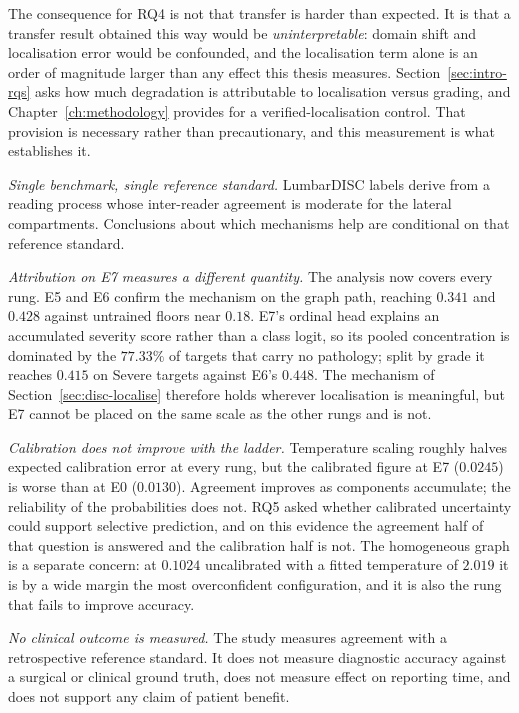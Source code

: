 \documentclass[12pt,a4paper]{report}
\begin{document}
The consequence for RQ4 is not that transfer is harder than expected. It is that
a transfer result obtained this way would be \emph{uninterpretable}: domain
shift and localisation error would be confounded, and the localisation term
alone is an order of magnitude larger than any effect this thesis measures.
Section~\ref{sec:intro-rqs} asks how much degradation is attributable to
localisation versus grading, and Chapter~\ref{ch:methodology} provides for a
verified-localisation control. That provision is necessary rather than
precautionary, and this measurement is what establishes it.

\emph{Single benchmark, single reference standard.} LumbarDISC labels derive
from a reading process whose inter-reader agreement is moderate for the lateral
compartments. Conclusions about which mechanisms help are conditional on that
reference standard.

\emph{Attribution on E7 measures a different quantity.} The analysis now covers
every rung. E5 and E6 confirm the mechanism on the graph path, reaching $0.341$
and $0.428$ against untrained floors near $0.18$. E7's ordinal head explains an
accumulated severity score rather than a class logit, so its pooled
concentration is dominated by the $77.33\%$ of targets that carry no pathology;
split by grade it reaches $0.415$ on Severe targets against E6's $0.448$. The
mechanism of Section~\ref{sec:disc-localise} therefore holds wherever
localisation is meaningful, but E7 cannot be placed on the same scale as the
other rungs and is not.

\emph{Calibration does not improve with the ladder.} Temperature scaling roughly
halves expected calibration error at every rung, but the calibrated figure at E7
($0.0245$) is worse than at E0 ($0.0130$). Agreement improves as components
accumulate; the reliability of the probabilities does not. RQ5 asked whether
calibrated uncertainty could support selective prediction, and on this evidence
the agreement half of that question is answered and the calibration half is not.
The homogeneous graph is a separate concern: at $0.1024$ uncalibrated with a
fitted temperature of $2.019$ it is by a wide margin the most overconfident
configuration, and it is also the rung that fails to improve accuracy.

\emph{No clinical outcome is measured.} The study measures agreement with a
retrospective reference standard. It does not measure diagnostic accuracy
against a surgical or clinical ground truth, does not measure effect on
reporting time, and does not support any claim of patient benefit.
\end{document}
